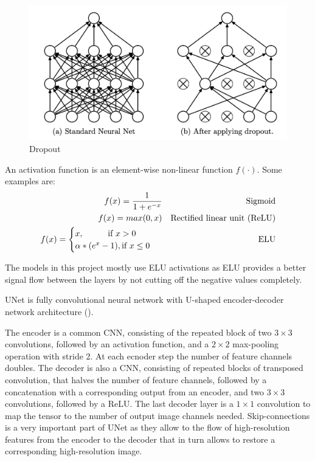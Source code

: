 \begin{figure}[H]
	\begin{center}
		\includegraphics[width=0.5\linewidth]{bilder/dropout.png}
		\caption{Dropout}\label{fig:dropout}
	\end{center}
\end{figure}

\begin{definition}
	An activation function is an element-wise non-linear function $f(\cdot)$. Some examples are:
	\begin{align}             
		f(x) = \frac{1}{1 + e^{-x}} &&\text{Sigmoid} \\      
		f(x) = max(0, x) &&\text{Rectified linear unit (ReLU)}\\
		f(x) = \begin{cases}
				x, \hspace*{1cm} \textrm{if } x > 0 \\
				\alpha * (e^{x} - 1), \textrm{if }  x \leq 0
		  	\end{cases}\ &&\text{ELU}
		\end{align}
\end{definition}

The models in this project mostly use ELU activations as ELU provides a better signal flow between the layers by not cutting off the negative values completely.

\begin{definition}[UNet]
	UNet is fully convolutional neural network with U-shaped encoder-decoder network architecture (\cite{Ronneberger_2015}).
\end{definition}

The encoder is a common CNN, consisting of the repeated
block of two $3 \times 3$ convolutions, followed by
an activation function, and a $2 \times 2$ max-pooling operation with stride 2. At each ecnoder step  the number of feature channels doubles. The decoder is also a CNN, consisting of repeated blocks of transposed convolution, that halves the number of feature channels, followed by a concatenation with a corresponding output from an encoder, and two $3 \times 3$ convolutions, followed by a ReLU. The last decoder layer is a $1 \times 1$ convolution to map the tensor to the number of output image channels needed. Skip-connections is a very important part of UNet as they allow to the flow of high-resolution features from the encoder to the decoder that in turn allows to restore a corresponding high-resolution image.

